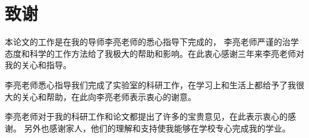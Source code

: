 
\chapter*{致\qquad 谢}

\vspace*{1cm}
本论文的工作是在我的导师李亮老师的悉心指导下完成的，
李亮老师严谨的治学态度和科学的工作方法给了我极大的帮助和影响。在此衷心感谢三年来李亮老师对我的关心和指导。

李亮老师悉心指导我们完成了实验室的科研工作，在学习上和生活上都给予了我很大的关心和帮助，在此向李亮老师表示衷心的谢意。

李亮老师对于我的科研工作和论文都提出了许多的宝贵意见，在此表示衷心的感谢。
另外也感谢家人，他们的理解和支持使我能够在学校专心完成我的学业。



